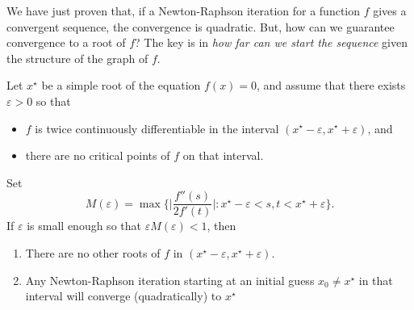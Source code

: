\begin{remark} 
We have just proven that, if a Newton-Raphson iteration for a function $f$ gives a convergent sequence, the convergence is quadratic.  But, how can we guarantee convergence to a root of $f$?  The key is in \emph{how far can we start the sequence} given the structure of the graph of $f$.
\end{remark}

\begin{theorem}\label{theorem:LCNR}
Let $x^\star$ be a simple root of the equation $f(x)=0$, and assume that there exists $\varepsilon > 0$ so that 
\begin{itemize}
	\item $f$ is twice continuously differentiable in the interval $(x^\star-\varepsilon, x^\star + \varepsilon)$, and
	\item there are no critical points of $f$ on that interval.
\end{itemize}  
Set
\begin{equation*}
M(\varepsilon) = \max \bigg\{ \bigg\lvert \frac{f''(s)}{2f'(t)} \bigg\rvert : x^\star -\varepsilon < s,t < x^\star + \varepsilon \bigg\}.
\end{equation*}
If $\varepsilon$ is small enough so that $\varepsilon M(\varepsilon) < 1$, then 
\begin{enumerate}
	\item \label{thm:LCNR1} There are no other roots of $f$ in $(x^\star -\varepsilon, x^\star+\varepsilon)$.
	\item \label{thm:LCNR2} Any Newton-Raphson iteration starting at an initial guess $x_0 \neq x^\star$ in that interval will converge (quadratically) to $x^\star$
\end{enumerate} 
\end{theorem}
